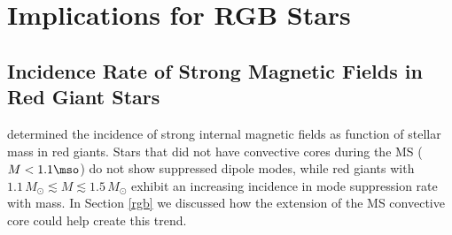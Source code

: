 \section{Implications for RGB Stars}
\subsection{Incidence Rate of Strong Magnetic Fields in Red Giant Stars}
\cite{Stello_2016} determined the incidence of strong internal magnetic fields as function of stellar mass in red giants. Stars that did not have convective cores during the MS ($M<1.1\mso$) do not show suppressed dipole modes, while red giants with $1.1 \, M_\odot \lesssim M \lesssim 1.5 \, M_\odot$ exhibit an increasing incidence in mode suppression rate with mass. In Section \ref{rgb} we discussed how the extension of the MS convective core could help create this trend. 


